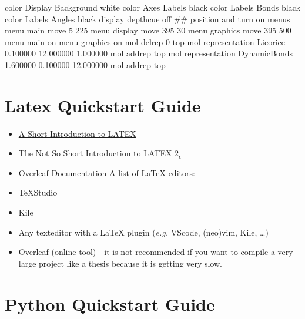 \documentclass[
  letterpaper,
  DIV=11,
  numbers=noendperiod]{scrreprt}
\newenvironment{Shaded}{\begin{snugshade}}{\end{snugshade}}
\newcommand{\CommentTok}[1]{\textcolor[rgb]{0.37,0.37,0.37}{#1}}
\newcommand{\DecValTok}[1]{\textcolor[rgb]{0.68,0.00,0.00}{#1}}
\newcommand{\FloatTok}[1]{\textcolor[rgb]{0.68,0.00,0.00}{#1}}
\newcommand{\NormalTok}[1]{\textcolor[rgb]{0.00,0.23,0.31}{#1}}
\begin{document}
\begin{Shaded}
\begin{Highlighting}[]
\NormalTok{    color Display Background white}
\NormalTok{    color Axes Labels black}
\NormalTok{    color Labels Bonds black}
\NormalTok{    color Labels Angles black}
\NormalTok{    display depthcue off}
    \CommentTok{\#\# position and turn on menus}
\NormalTok{    menu main move }\DecValTok{5} \DecValTok{225}
\NormalTok{    menu display move }\DecValTok{395} \DecValTok{30}
\NormalTok{    menu graphics move }\DecValTok{395} \DecValTok{500}
\NormalTok{    menu main on}
\NormalTok{    menu graphics on}
\NormalTok{    mol delrep }\DecValTok{0}\NormalTok{ top}
\NormalTok{    mol representation Licorice }\FloatTok{0.100000} \FloatTok{12.000000} \FloatTok{1.000000}
\NormalTok{    mol addrep top}
\NormalTok{    mol representation DynamicBonds }\FloatTok{1.600000} \FloatTok{0.100000} \FloatTok{12.000000}
\NormalTok{    mol addrep top}
\end{Highlighting}
\end{Shaded}

\hypertarget{latex-quickstart-guide}{%
\chapter{Latex Quickstart Guide}\label{latex-quickstart-guide}}

\begin{itemize}
\item
  \href{http://www.math.uco.edu/pages/rwilliams/math3183-fall2018/Short_LaTeX_Intro.pdf}{A
  Short Introduction to LATEX}
\item
  \href{https://tobi.oetiker.ch/lshort/lshort.pdf}{The Not So Short
  Introduction to LATEX 2\(_\epsilon\)}
\item
  \href{https://de.overleaf.com/learn}{Overleaf Documentation} A list of
  LaTeX editors:\\
\item
  TeXStudio
\item
  Kile
\item
  Any texteditor with a LaTeX plugin (\emph{e.g.} VScode, (neo)vim,
  Kile, \ldots)
\item
  \href{https://de.overleaf.com/}{Overleaf} (online tool) - it is not
  recommended if you want to compile a very large project like a thesis
  because it is getting very slow.
\end{itemize}

\hypertarget{python-quickstart-guide}{%
\chapter{Python Quickstart Guide}\label{python-quickstart-guide}}
\end{document}
